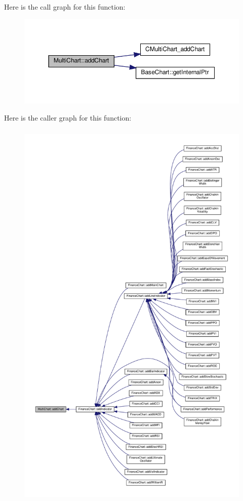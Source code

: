 Here is the call graph for this function\+:
\nopagebreak
\begin{figure}[H]
\begin{center}
\leavevmode
\includegraphics[width=350pt]{class_multi_chart_a8a41f5565f6914264044ddd99af9a6e9_cgraph}
\end{center}
\end{figure}
Here is the caller graph for this function\+:
\nopagebreak
\begin{figure}[H]
\begin{center}
\leavevmode
\includegraphics[height=550pt]{class_multi_chart_a8a41f5565f6914264044ddd99af9a6e9_icgraph}
\end{center}
\end{figure}
\mbox{\label{class_multi_chart_ad32164a35e145d046fbcf5ccd9c839de}} 
